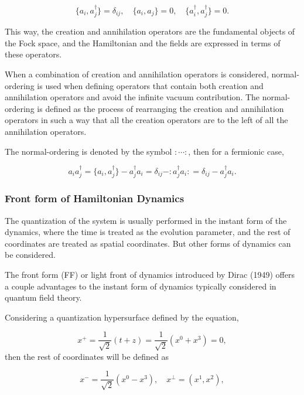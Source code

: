 \documentclass[11pt,a4paper,twoside,pdf]{article}
\numberwithin{equation}{section}
\begin{document}
\begin{equation}
    \{a_i, a_j^\dagger\} = \delta_{ij}, \quad
    \{a_i, a_j\} = 0, \quad
    \{a_i^\dagger, a_j^\dagger\} = 0.
\end{equation}

This way, the creation and annihilation operators are the fundamental objects of the
Fock space, and the Hamiltonian and the fields are expressed in terms of these operators.


When a combination of creation and annihilation operators is considered, normal-ordering is
used when defining operators that contain both creation and annihilation operators
and avoid the infinite vacuum contribution. The normal-ordering is defined as the 
process of rearranging the creation and annihilation operators in such a way that 
all the creation operators are to the left of all the annihilation operators.

The normal-ordering is denoted by the symbol $:\cdots:$, then for a fermionic case, 

\begin{equation}
    a_i a_j^\dagger =  \{a_i, a_j^\dagger\} -  a_j^\dagger a_i = 
    \delta_{ij} - :a_j^\dagger a_i: = \delta_{ij} - a_j^\dagger a_i.
\end{equation}

\subsubsection{Front form of Hamiltonian Dynamics}


The quantization of the system is usually performed in the instant form of the 
dynamics, where the time is treated as the evolution parameter, and the rest of
coordinates are treated as spatial coordinates. But other forms of dynamics 
can be considered.

The front form (FF) or light front of dynamics introduced by Dirac (1949) 
\cite{dirac_front_forms_1949} offers a couple advantages to the instant form of 
dynamics typically considered in quantum field theory. 

Considering a quantization hypersurface defined by the equation,

\begin{equation}
    x^+ = \frac{1}{\sqrt{2}} (t+z) = \frac{1}{\sqrt{2}} (x^0 + x^3) = 0,
\end{equation}
then the rest of coordinates will be defined as

\begin{equation}
    x^- = \frac{1}{\sqrt{2}} (x^0-x^3), \quad x^\perp = (x^1, x^2),
\end{equation}
\end{document}
